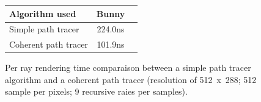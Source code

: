 \begin{figure}[H]
    \tiny
    \centering
    \begin{tabular}{ | l | c | c | }

        \hline
        Algorithm used & Bunny \\
        \hline
        Simple path tracer & 224.0ns \\
        Coherent path tracer & 101.9ns \\
        \hline

    \end{tabular}
    \caption{
        Per ray rendering time comparaison between a simple path tracer
        algorithm and a coherent path tracer (resolution of 512~x~288; 512
        sample per pixels; 9 recursive raies per samples).
    }
    \label{table:cpt_compare}
\end{figure}
